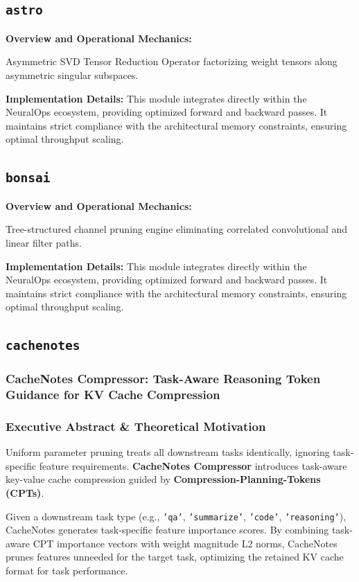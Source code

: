 \subsection{\texttt{astro}}
\textbf{Overview and Operational Mechanics:}

Asymmetric SVD Tensor Reduction Operator factorizing weight tensors along asymmetric singular subspaces.

\textbf{Implementation Details:}
This module integrates directly within the NeuralOps ecosystem, providing optimized forward and backward passes. It maintains strict compliance with the architectural memory constraints, ensuring optimal throughput scaling.

\subsection{\texttt{bonsai}}
\textbf{Overview and Operational Mechanics:}

Tree-structured channel pruning engine eliminating correlated convolutional and linear filter paths.

\textbf{Implementation Details:}
This module integrates directly within the NeuralOps ecosystem, providing optimized forward and backward passes. It maintains strict compliance with the architectural memory constraints, ensuring optimal throughput scaling.

\subsection{\texttt{cachenotes}}
\subsubsection*{CacheNotes Compressor: Task-Aware Reasoning Token Guidance for KV Cache Compression}

\subsubsection*{Executive Abstract \& Theoretical Motivation}

Uniform parameter pruning treats all downstream tasks identically, ignoring task-specific feature requirements. \textbf{CacheNotes Compressor} introduces task-aware key-value cache compression guided by \textbf{Compression-Planning-Tokens (CPTs)}.

Given a downstream task type (e.g., \texttt{'qa'}, \texttt{'summarize'}, \texttt{'code'}, \texttt{'reasoning'}), CacheNotes generates task-specific feature importance scores. By combining task-aware CPT importance vectors with weight magnitude L2 norms, CacheNotes prunes features unneeded for the target task, optimizing the retained KV cache format for task performance.

